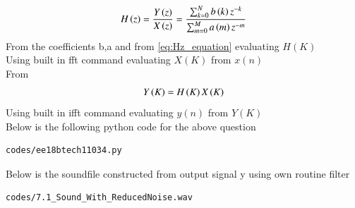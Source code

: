 \documentclass[journal,12pt,twocolumn]{IEEEtran}
\begin{document}
\begin{align}
\label{eq:Hz_equation}
    H\brak{z} = \frac{Y\brak{z}}{X\brak{z}} = \frac{\sum _{k=0}^{N}b\brak{k} z^{-k}}{\sum _{m=0}^{M}a\brak{m}z^{-m}}
\end{align}    
From the coefficients b,a and from \eqref{eq:Hz_equation} evaluating $H(K)$
\\
Using built in fft command evaluating $X(K)$ from $x(n)$\\
From 
\begin{align}
    Y\left(K\right) = H\left(K\right)X\left(K\right)
\end{align}
Using built in ifft command evaluating $y(n)$ from $Y(K)$
\\
Below is the following python code for the above question
\begin{lstlisting}
codes/ee18btech11034.py
\end{lstlisting}

Below is the soundfile constructed from output signal y using own routine filter 
\begin{lstlisting}
codes/7.1_Sound_With_ReducedNoise.wav
\end{lstlisting}
\end{document}
